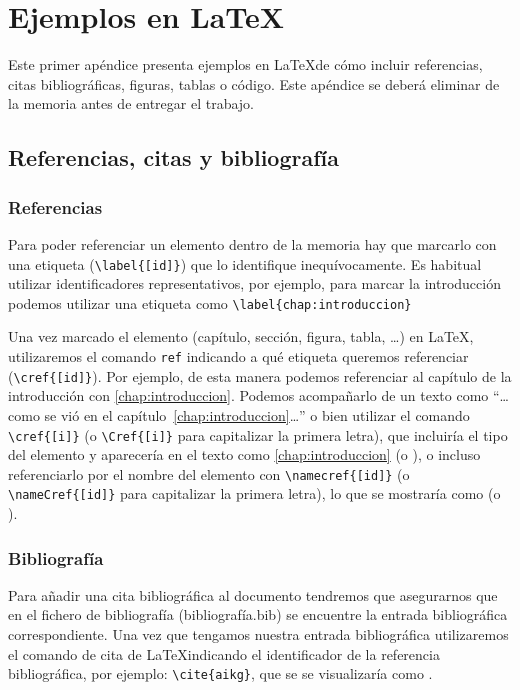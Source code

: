 \chapter{Ejemplos en \LaTeX}

Este primer apéndice presenta ejemplos en \LaTeX de cómo incluir referencias, citas bibliográficas, figuras, tablas o código. Este apéndice se deberá eliminar de la memoria antes de entregar el trabajo. 

\section{Referencias, citas y bibliografía}
\subsection{Referencias}
Para poder referenciar un elemento dentro de la memoria hay que marcarlo con una etiqueta (\verb|\label{[id]}|) que lo identifique inequívocamente. Es habitual utilizar identificadores  representativos, por ejemplo, para marcar la introducción podemos utilizar una etiqueta como \verb|\label{chap:introduccion}|

Una vez marcado el elemento (capítulo, sección, figura, tabla, \ldots) en \LaTeX, utilizaremos el comando \verb|ref| indicando a qué etiqueta queremos referenciar (\verb|\cref{[id]}|). Por ejemplo, de esta manera podemos referenciar al capítulo de la introducción con \ref{chap:introduccion}. Podemos acompañarlo de un texto como ``\ldots como se vió en el capítulo~\ref{chap:introduccion}\ldots'' o bien utilizar el comando \verb|\cref{[i]}| (o \verb|\Cref{[i]}| para capitalizar la primera letra), que incluiría el tipo del elemento y aparecería en el texto como \cref{chap:introduccion} (o ), o incluso referenciarlo por el nombre del elemento con \verb|\namecref{[id]}| (o \verb|\nameCref{[id]}| para capitalizar la primera letra), lo que se mostraría como  (o ). 

\subsection{Bibliografía}
Para añadir una cita bibliográfica al documento tendremos que asegurarnos que en el fichero de bibliografía (bibliografía.bib) se encuentre la entrada bibliográfica correspondiente. Una vez que tengamos nuestra entrada bibliográfica utilizaremos el comando de cita de \LaTeX indicando el identificador de la referencia bibliográfica, por ejemplo: 
\verb|\cite{aikg}|, que se se visualizaría como \cite{aikg}. 

